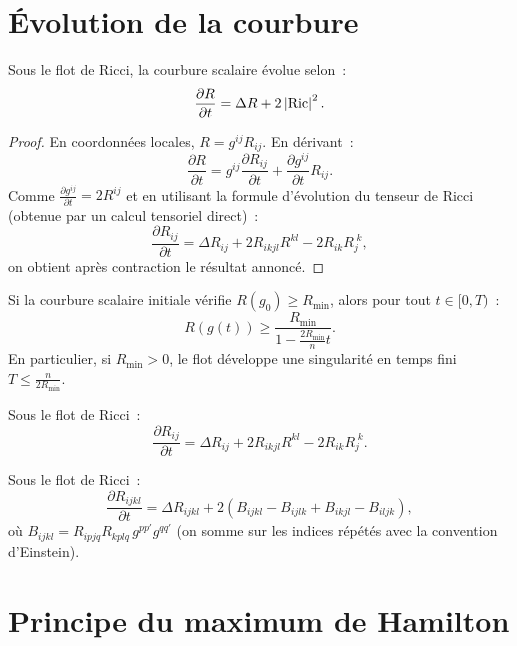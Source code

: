 \section{\'Evolution de la courbure}

\begin{theoreme}
\label{thm:evolution_R}
Sous le flot de Ricci, la courbure scalaire \'evolue selon~:
\[
    \frac{\partial R}{\partial t} = \Delta R + 2\left| \operatorname{Ric} \right|^2.
\]
\end{theoreme}

\begin{proof}
En coordonn\'ees locales, $R = g^{ij} R_{ij}$. En d\'erivant~:
\[
    \frac{\partial R}{\partial t} = g^{ij} \frac{\partial R_{ij}}{\partial t}
    + \frac{\partial g^{ij}}{\partial t} R_{ij}.
\]
Comme $\frac{\partial g^{ij}}{\partial t} = 2R^{ij}$ et en utilisant la formule
d'\'evolution du tenseur de Ricci (obtenue par un calcul tensoriel direct)~:
\[
    \frac{\partial R_{ij}}{\partial t} = \Delta R_{ij} + 2R_{ikjl}R^{kl}
    - 2R_{ik}R_j^{\;k},
\]
on obtient apr\`es contraction le r\'esultat annonc\'e.
\end{proof}

\begin{corollaire}
Si la courbure scalaire initiale v\'erifie $R(g_0) \geq R_{\min}$, alors
pour tout $t \in [0, T)$~:
\[
    R(g(t)) \geq \frac{R_{\min}}{1 - \frac{2R_{\min}}{n} t}.
\]
En particulier, si $R_{\min} > 0$, le flot d\'eveloppe une singularit\'e en temps fini
$T \leq \frac{n}{2R_{\min}}$.
\end{corollaire}

\begin{theoreme}
Sous le flot de Ricci~:
\[
    \frac{\partial R_{ij}}{\partial t} = \Delta R_{ij}
    + 2R_{ikjl}R^{kl} - 2R_{ik}R_j^{\;k}.
\]
\end{theoreme}

\begin{theoreme}
Sous le flot de Ricci~:
\[
    \frac{\partial R_{ijkl}}{\partial t} = \Delta R_{ijkl}
    + 2(B_{ijkl} - B_{ijlk} + B_{ikjl} - B_{iljk}),
\]
o\`u $B_{ijkl} = R_{ipjq}R_{kplq}\, g^{pp'} g^{qq'}$ (on somme sur les indices
r\'ep\'et\'es avec la convention d'Einstein).
\end{theoreme}

\section{Principe du maximum de Hamilton}

